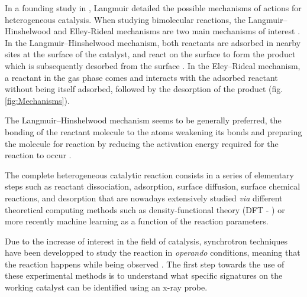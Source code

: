 In a founding study in \cite*{Langmuir1922}, Langmuir detailed the possible mechanisms of actions for heterogeneous catalysis.
When studying bimolecular reactions, the Langmuir–Hinshelwood and Elley-Rideal mechanisms are two main mechanisms of interest \parencite{catal12101134}.
In the Langmuir–Hinshelwood mechanism, both reactants are adsorbed in nearby sites at the surface of the catalyst, and react on the surface to form the product which is subsequently desorbed from the surface \parencite{Prins2018, ROSS2019}.
In the Eley–Rideal mechanism, a reactant in the gas phase comes and interacts with the adsorbed reactant without being itself adsorbed, followed by the desorption of the product \parencite{rideal_1939, Weinberg1996}  (fig. \ref{fig:Mechanisms}).


The Langmuir–Hinshelwood mechanism seems to be generally preferred, the bonding of the reactant molecule to the atoms weakening its bonds and preparing the molecule for reaction by reducing the activation energy required for the reaction to occur \parencite{Baxter2002}.

The complete heterogeneous catalytic reaction consists in a series of elementary steps such as reactant dissociation, adsorption, surface diffusion, surface chemical reactions, and desorption that are nowadays extensively studied \textit{via} different theoretical computing methods such as density-functional theory (DFT - \cite{Reuter2004, Molenbroek2009, Yawei2015, Gaggioli2019, Chatelier2020}) or more recently machine learning \parencite{Kitchin2018, Schlexer2019, Anstine2023} as a function of the reaction parameters.

Due to the increase of interest in the field of catalysis, synchrotron techniques have been developped to study the reaction in \textit{operando} conditions, meaning that the reaction happens while being observed \parencite{Meirer2018}.
The first step towards the use of these experimental methods is to understand what specific signatures on the working catalyst can be identified using an x-ray probe.

